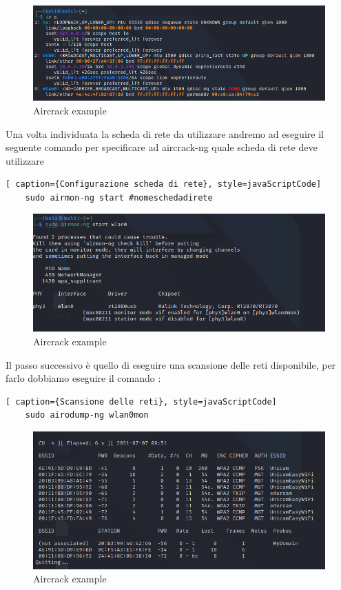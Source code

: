 \begin{figure}[h!]
    \centering
    \includegraphics[width=\linewidth]{Immagini/6/aircrack_1.png}
    \caption{Aircrack example}
\end{figure}

\newpage

Una volta individuata la scheda di rete da utilizzare andremo ad eseguire il seguente comando per specificare ad aircrack-ng quale scheda di rete deve utilizzare

\begin{lstlisting}[ caption={Configurazione scheda di rete}, style=javaScriptCode]
	sudo airmon-ng start #nomeschedadirete
\end{lstlisting}

\begin{figure}[ht]
    \centering
    \includegraphics[width=\linewidth]{Immagini/6/aircrack_2.png}
    \caption{Aircrack example}
\end{figure}

Il passo successivo è quello di eseguire una scansione delle reti disponibile, per farlo dobbiamo eseguire il comando :

\begin{lstlisting}[ caption={Scansione delle reti}, style=javaScriptCode]
	sudo airodump-ng wlan0mon
\end{lstlisting}

\begin{figure}[ht]
    \centering
    \includegraphics[width=\linewidth]{Immagini/6/aircrack_3.png}
    \caption{Aircrack example}
    \label{fig:Aircrack example}
\end{figure}

